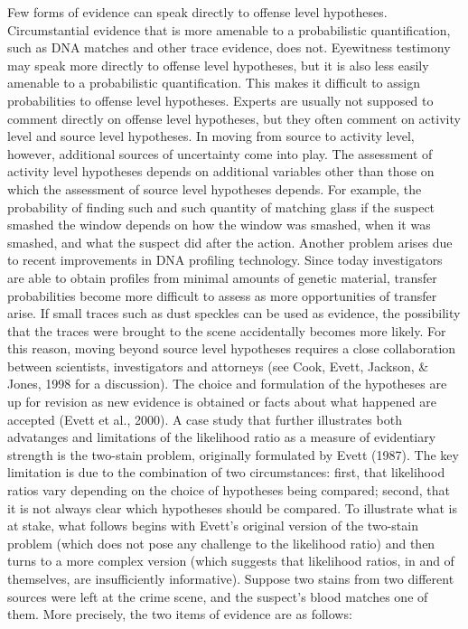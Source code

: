 \documentclass[10pt,dvipsnames,enabledeprecatedfontcommands]{scrartcl}
\begin{document}

Few forms of evidence can speak directly to offense level hypotheses.
Circumstantial evidence that is more amenable to a probabilistic
quantification, such as DNA matches and other trace evidence, does not.
Eyewitness testimony may speak more directly to offense level
hypotheses, but it is also less easily amenable to a probabilistic
quantification. This makes it difficult to assign probabilities to
offense level hypotheses. Experts are usually not supposed to comment
directly on offense level hypotheses, but they often comment on activity
level and source level hypotheses. In moving from source to activity
level, however, additional sources of uncertainty come into play. The
assessment of activity level hypotheses depends on additional variables
other than those on which the assessment of source level hypotheses
depends. For example, the probability of finding such and such quantity
of matching glass if the suspect smashed the window depends on how the
window was smashed, when it was smashed, and what the suspect did after
the action. Another problem arises due to recent improvements in DNA
profiling technology. Since today investigators are able to obtain
profiles from minimal amounts of genetic material, transfer
probabilities become more difficult to assess as more opportunities of
transfer arise. If small traces such as dust speckles can be used as
evidence, the possibility that the traces were brought to the scene
accidentally becomes more likely. For this reason, moving beyond source
level hypotheses requires a close collaboration between scientists,
investigators and attorneys (see Cook, Evett, Jackson, \& Jones, 1998
for a discussion). The choice and formulation of the hypotheses are up
for revision as new evidence is obtained or facts about what happened
are accepted (Evett et al., 2000). A case study that further illustrates
both advatanges and limitations of the likelihood ratio as a measure of
evidentiary strength is the two-stain problem, originally formulated by
Evett (1987). The key limitation is due to the combination of two
circumstances: first, that likelihood ratios vary depending on the
choice of hypotheses being compared; second, that it is not always clear
which hypotheses should be compared. To illustrate what is at stake,
what follows begins with Evett's original version of the two-stain
problem (which does not pose any challenge to the likelihood ratio) and
then turns to a more complex version (which suggests that likelihood
ratios, in and of themselves, are insufficiently informative). Suppose
two stains from two different sources were left at the crime scene, and
the suspect's blood matches one of them. More precisely, the two items
of evidence are as follows: \vspace{2mm}
\end{document}
